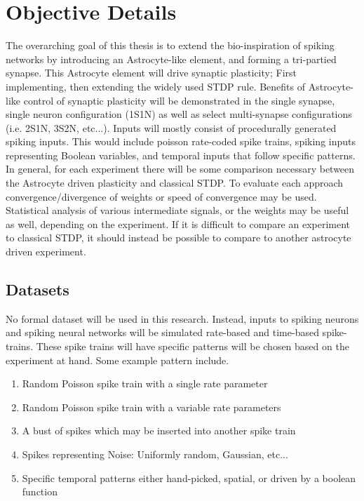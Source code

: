 %
%


\chapter{Objective Details}\label{section:objective_details}
    The overarching goal of this thesis is to extend the bio-inspiration of
    spiking networks by introducing an Astrocyte-like element, and forming a
    tri-partied synapse. This Astrocyte element will drive synaptic plasticity;
    First implementing, then extending the widely used STDP rule. Benefits of
    Astrocyte-like control of synaptic plasticity will be demonstrated in the
    single synapse, single neuron configuration (1S1N) as well as select
    multi-synapse configurations (i.e. 2S1N, 3S2N, etc...). Inputs will mostly
    consist of procedurally generated spiking inputs. This would include poisson
    rate-coded spike trains, spiking inputs representing Boolean variables, and
    temporal inputs that follow specific patterns. In general, for each
    experiment there will be some comparison necessary between the Astrocyte
    driven plasticity and classical STDP. To evaluate each approach
    convergence/divergence of weights or speed of convergence may be
    used. Statistical analysis of various intermediate signals, or the weights
    may be useful as well, depending on the experiment. If it is difficult to
    compare an experiment to classical STDP, it should instead be possible to
    compare to another astrocyte driven experiment.

    \section{Datasets} \label{section:datasets}
    No formal dataset will be used in this research. Instead, inputs to spiking
    neurons and spiking neural networks will be simulated rate-based and
    time-based spike-trains. These spike trains will have specific patterns will
    be chosen based on the experiment at hand. Some example pattern include.
    \begin{enumerate}
    \item Random Poisson spike train with a single rate parameter
    \item Random Poisson spike train with a variable rate parameters
    \item A bust of spikes which may be inserted into another spike train
    \item Spikes representing Noise: Uniformly random, Gaussian, etc...
    \item Specific temporal patterns either hand-picked, spatial, or driven by a
      boolean function
    \end{enumerate}
        
